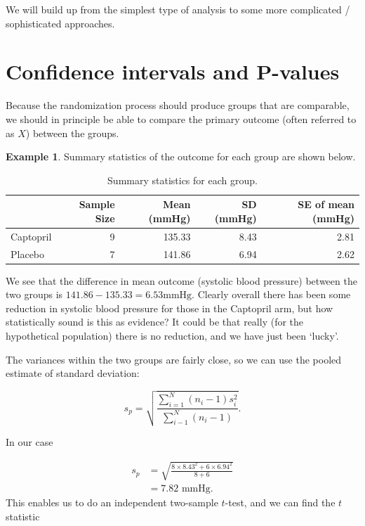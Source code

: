 \documentclass[
  openany]{book}
\theoremstyle{definition}
\theoremstyle{definition}
\newtheorem{example}{Example}[chapter]
\theoremstyle{definition}
\theoremstyle{definition}
\theoremstyle{remark}
\begin{document}
We will build up from the simplest type of analysis to some more complicated / sophisticated approaches.

\hypertarget{ttest}{%
\section{Confidence intervals and P-values}\label{ttest}}

Because the randomization process should produce groups that are comparable, we should in principle be able to compare the primary outcome (often referred to as \(X\)) between the groups.

\begin{example}
Summary statistics of the outcome for each group are shown below.

\begin{table}

\caption{\label{tab:unnamed-chunk-11}Summary statistics for each group.}
\centering
\begin{tabular}[t]{l|r|r|r|r}
\hline
  & Sample Size & Mean (mmHg) & SD (mmHg) & SE of mean (mmHg)\\
\hline
Captopril & 9 & 135.33 & 8.43 & 2.81\\
\hline
Placebo & 7 & 141.86 & 6.94 & 2.62\\
\hline
\end{tabular}
\end{table}

We see that the difference in mean outcome (systolic blood pressure) between the two groups is \(141.86 - 135.33 = 6.53 \text{mmHg}\). Clearly overall there has been some reduction in systolic blood pressure for those in the Captopril arm, but how statistically sound is this as evidence? It could be that really (for the hypothetical population) there is no reduction, and we have just been `lucky'.

The variances within the two groups are fairly close, so we can use the pooled estimate of standard deviation:

\[
  s_p = \sqrt{\frac{\sum\limits_{i=1}^N\left(n_i-1\right)s_i^2}{\sum\limits_{i-1}^N\left(n_i-1\right)}}.
\]

In our case

\[ 
  \begin{aligned}
s_p&= \sqrt{\frac{8\times{8.43^2} + 6 \times{6.94^2}}{8+6}}\\
& = 7.82\text{ mmHg.}
\end{aligned}
\]
This enables us to do an independent two-sample \(t\)-test, and we can find the \(t\) statistic


\end{example}
\end{document}
